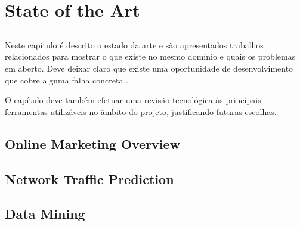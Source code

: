 \chapter{State of the Art} \label{chap:sota}

\section*{}

Neste capítulo é descrito o estado da arte e são
apresentados trabalhos relacionados para mostrar o que existe no
mesmo domínio e quais os problemas em aberto.
Deve deixar claro que existe uma oportunidade de desenvolvimento que
cobre alguma falha concreta .

O capítulo deve também efetuar uma revisão tecnológica às principais
ferramentas utilizáveis no âmbito do projeto, justificando futuras
escolhas.

\section{Online Marketing Overview}


\section{Network Traffic Prediction}\label{sec:network}

\section{Data Mining}\label{sec:datamining}

